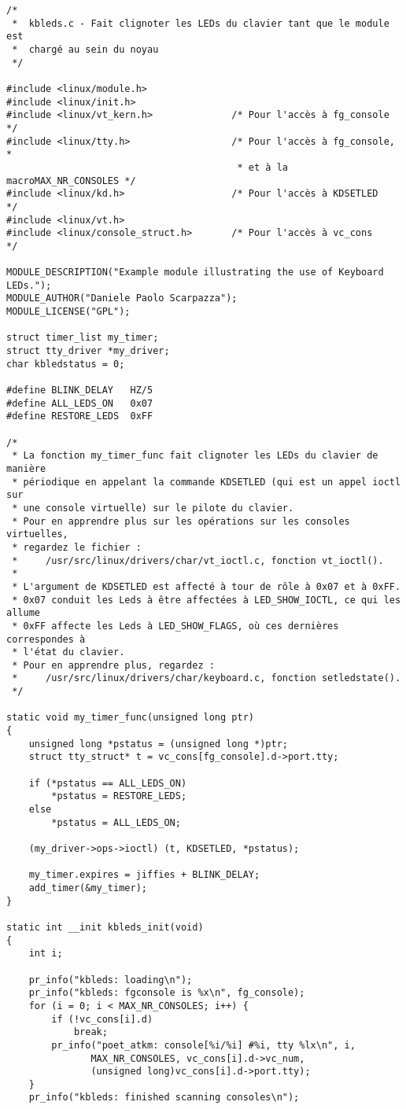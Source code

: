 \documentclass[11pt]{article}
\begin{document}
\begin{verbatim}
/*
 *  kbleds.c - Fait clignoter les LEDs du clavier tant que le module est
 *  chargé au sein du noyau
 */

#include <linux/module.h>
#include <linux/init.h>
#include <linux/vt_kern.h>              /* Pour l'accès à fg_console    */
#include <linux/tty.h>                  /* Pour l'accès à fg_console,   *
                                         * et à la macroMAX_NR_CONSOLES */
#include <linux/kd.h>                   /* Pour l'accès à KDSETLED      */
#include <linux/vt.h>
#include <linux/console_struct.h>       /* Pour l'accès à vc_cons       */

MODULE_DESCRIPTION("Example module illustrating the use of Keyboard LEDs.");
MODULE_AUTHOR("Daniele Paolo Scarpazza");
MODULE_LICENSE("GPL");

struct timer_list my_timer;
struct tty_driver *my_driver;
char kbledstatus = 0;

#define BLINK_DELAY   HZ/5
#define ALL_LEDS_ON   0x07
#define RESTORE_LEDS  0xFF

/*
 * La fonction my_timer_func fait clignoter les LEDs du clavier de manière
 * périodique en appelant la commande KDSETLED (qui est un appel ioctl sur
 * une console virtuelle) sur le pilote du clavier.
 * Pour en apprendre plus sur les opérations sur les consoles virtuelles,
 * regardez le fichier :
 *     /usr/src/linux/drivers/char/vt_ioctl.c, fonction vt_ioctl().
 *
 * L'argument de KDSETLED est affecté à tour de rôle à 0x07 et à 0xFF.
 * 0x07 conduit les Leds à être affectées à LED_SHOW_IOCTL, ce qui les allume
 * 0xFF affecte les Leds à LED_SHOW_FLAGS, où ces dernières correspondes à
 * l'état du clavier.
 * Pour en apprendre plus, regardez :
 *     /usr/src/linux/drivers/char/keyboard.c, fonction setledstate().
 */

static void my_timer_func(unsigned long ptr)
{
    unsigned long *pstatus = (unsigned long *)ptr;
    struct tty_struct* t = vc_cons[fg_console].d->port.tty;

    if (*pstatus == ALL_LEDS_ON)
        *pstatus = RESTORE_LEDS;
    else
        *pstatus = ALL_LEDS_ON;

    (my_driver->ops->ioctl) (t, KDSETLED, *pstatus);

    my_timer.expires = jiffies + BLINK_DELAY;
    add_timer(&my_timer);
}

static int __init kbleds_init(void)
{
    int i;

    pr_info("kbleds: loading\n");
    pr_info("kbleds: fgconsole is %x\n", fg_console);
    for (i = 0; i < MAX_NR_CONSOLES; i++) {
        if (!vc_cons[i].d)
            break;
        pr_info("poet_atkm: console[%i/%i] #%i, tty %lx\n", i,
               MAX_NR_CONSOLES, vc_cons[i].d->vc_num,
               (unsigned long)vc_cons[i].d->port.tty);
    }
    pr_info("kbleds: finished scanning consoles\n");


\end{verbatim}
\end{document}
